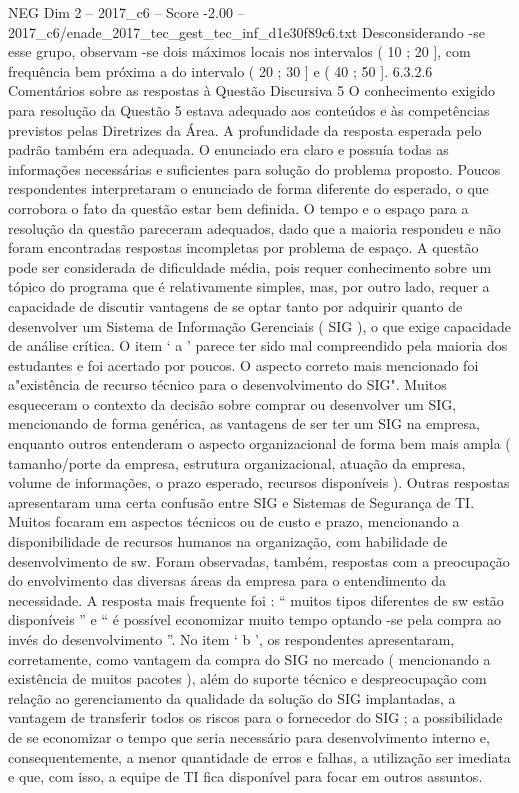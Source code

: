 \begin{textsample}{NEG Dim 2 – 2017\_c6 – Score -2.00 – 2017\_c6/enade\_2017\_tec\_gest\_tec\_inf\_d1e30f89c6.txt}
Desconsiderando -se esse grupo, observam -se dois máximos locais nos intervalos ( 10 ; 20 ], com frequência bem próxima a do intervalo ( 20 ; 30 ] e ( 40 ; 50 ]. 6.3.2.6 Comentários sobre as respostas à Questão Discursiva 5 O conhecimento exigido para resolução da Questão 5 estava adequado aos conteúdos e às competências previstos pelas Diretrizes da Área.
A profundidade da resposta esperada pelo padrão também era adequada.
O enunciado era claro e possuía todas as informações necessárias e suficientes para solução do problema proposto.
Poucos respondentes interpretaram o enunciado de forma diferente do esperado, o que corrobora o fato da questão estar bem definida.
O tempo e o espaço para a resolução da questão pareceram adequados, dado que a maioria respondeu e não foram encontradas respostas incompletas por problema de espaço.
A questão pode ser considerada de dificuldade média, pois requer conhecimento sobre um tópico do programa que é relativamente simples, mas, por outro lado, requer a capacidade de discutir vantagens de se optar tanto por adquirir quanto de desenvolver um Sistema de Informação Gerenciais ( SIG ), o que exige capacidade de análise crítica.
O item ‘ a ’ parece ter sido mal compreendido pela maioria dos estudantes e foi acertado por poucos.
O aspecto correto mais mencionado foi a"existência de recurso técnico para o desenvolvimento do SIG".
Muitos esqueceram o contexto da decisão sobre comprar ou desenvolver um SIG, mencionando de forma genérica, as vantagens de ser ter um SIG na empresa, enquanto outros entenderam o aspecto organizacional de forma bem mais ampla ( tamanho/porte da empresa, estrutura organizacional, atuação da empresa, volume de informações, o prazo esperado, recursos disponíveis ).
Outras respostas apresentaram uma certa confusão entre SIG e Sistemas de Segurança de TI.
Muitos focaram em aspectos técnicos ou de custo e prazo, mencionando a disponibilidade de recursos humanos na organização, com habilidade de desenvolvimento de sw.
Foram observadas, também, respostas com a preocupação do envolvimento das diversas áreas da empresa para o entendimento da necessidade.
A resposta mais frequente foi : “ muitos tipos diferentes de sw estão disponíveis ” e “ é possível economizar muito tempo optando -se pela compra ao invés do desenvolvimento ”.
No item ‘ b ’, os respondentes apresentaram, corretamente, como vantagem da compra do SIG no mercado ( mencionando a existência de muitos pacotes ), além do suporte técnico e despreocupação com relação ao gerenciamento da qualidade da solução do SIG implantadas, a vantagem de transferir todos os riscos para o fornecedor do SIG ; a possibilidade de se economizar o tempo que seria necessário para desenvolvimento interno e, consequentemente, a menor quantidade de erros e falhas, a utilização ser imediata e que, com isso, a equipe de TI fica disponível para focar em outros assuntos.

\end{textsample}
